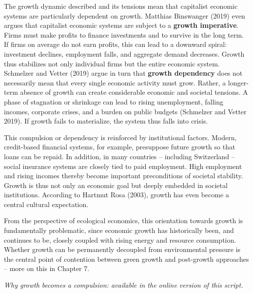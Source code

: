 \documentclass[
  british,
  a4paper,
  DIV=11,
  numbers=noendperiod,
  oneside,
  openany]{scrreprt}
\begin{document}
The growth dynamic described and its tensions mean that capitalist
economic systems are particularly dependent on growth. Matthias
Binswanger (2019) even argues that capitalist economic systems are
subject to a \textbf{growth imperative}. Firms must make profits to
finance investments and to survive in the long term. If firms on average
do not earn profits, this can lead to a downward spiral: investment
declines, employment falls, and aggregate demand decreases. Growth thus
stabilizes not only individual firms but the entire economic system.
Schmelzer and Vetter (2019) argue in turn that \textbf{growth
dependency} does not necessarily mean that every single economic
activity must grow. Rather, a longer-term absence of growth can create
considerable economic and societal tensions. A phase of stagnation or
shrinkage can lead to rising unemployment, falling incomes, corporate
crises, and a burden on public budgets (Schmelzer and Vetter 2019). If
growth fails to materialize, the system thus falls into crisis.

This compulsion or dependency is reinforced by institutional factors.
Modern, credit-based financial systems, for example, presuppose future
growth so that loans can be repaid. In addition, in many countries --
including Switzerland -- social insurance systems are closely tied to
paid employment. High employment and rising incomes thereby become
important preconditions of societal stability. Growth is thus not only
an economic goal but deeply embedded in societal institutions. According
to Hartmut Rosa (2003), growth has even become a central cultural
expectation.

From the perspective of ecological economics, this orientation towards
growth is fundamentally problematic, since economic growth has
historically been, and continues to be, closely coupled with rising
energy and resource consumption. Whether growth can be permanently
decoupled from environmental pressure is the central point of contention
between green growth and post-growth approaches -- more on this in
Chapter 7.

\begin{tcolorbox}[enhanced jigsaw, arc=.35mm, bottomrule=.15mm, bottomtitle=1mm, breakable, colback=white, colbacktitle=quarto-callout-caution-color!10!white, colframe=quarto-callout-caution-color-frame, coltitle=black, left=2mm, leftrule=.75mm, opacityback=0, opacitybacktitle=0.6, rightrule=.15mm, title={Interactive exercise -- Why growth becomes a compulsion}, titlerule=0mm, toprule=.15mm, toptitle=1mm]

\emph{Why growth becomes a compulsion: available in the online version of this script.}

\end{tcolorbox}
\end{document}
